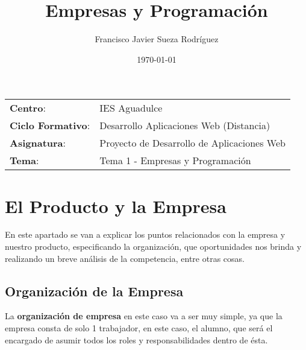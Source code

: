 


\title{
\vspace{10ex}
\normalfont \normalsize
\huge \textbf{Empresas y Programación}
}
\author{Francisco Javier Sueza Rodríguez}
\date{\normalsize\today}




\maketitle

\thispagestyle{empty}

\vspace{65ex}

\begin{center}
    \begin{tabular}{l l}
        \textbf{Centro}: & IES Aguadulce \\
        \textbf{Ciclo Formativo}: & Desarrollo Aplicaciones Web (Distancia)\\
        \textbf{Asignatura}: & Proyecto de Desarrollo de Aplicaciones Web\\
        \textbf{Tema}: & Tema 1 - Empresas y Programación\\
    \end{tabular}
\end{center}

\newpage

\tableofcontents

\newpage

\section{El Producto y la Empresa}
En este apartado se van a explicar los puntos relacionados con la empresa y nuestro producto, especificando la organización, que oportunidades nos brinda y realizando un breve análisis de la competencia, entre otras cosas.

\subsection{Organización de la Empresa}
La \textbf{organización de empresa} en este caso va a ser muy simple, ya que la empresa consta de solo 1 trabajador, en este caso, el alumno, que será el encargado de asumir todos los roles y responsabilidades dentro de ésta.

